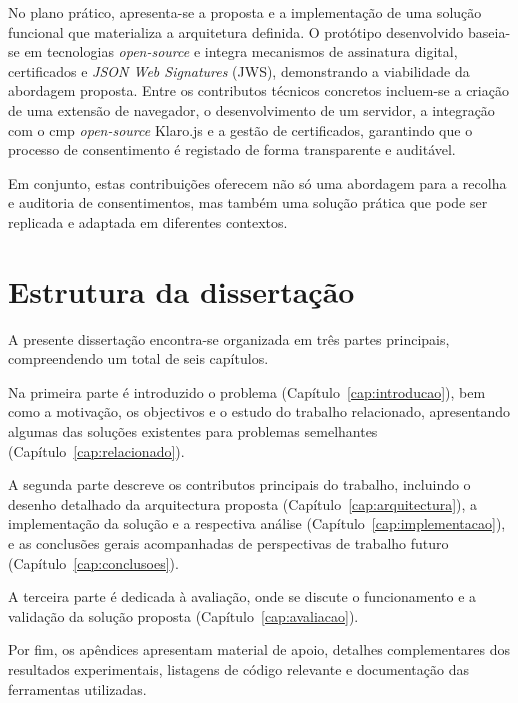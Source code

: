 No plano prático, apresenta-se a proposta e a implementação de uma solução funcional que materializa a arquitetura definida. O protótipo desenvolvido baseia-se em tecnologias \textit{open-source} e integra mecanismos de assinatura digital, certificados e \textit{JSON Web Signatures} (JWS), demonstrando a viabilidade da abordagem proposta. Entre os contributos técnicos concretos incluem-se a criação de uma extensão de navegador, o desenvolvimento de um servidor, a integração com o \acrshort{cmp} \textit{open-source} Klaro.js e a gestão de certificados, garantindo que o processo de consentimento é registado de forma transparente e auditável.

Em conjunto, estas contribuições oferecem não só uma abordagem para a recolha e auditoria de consentimentos, mas também uma solução prática que pode ser replicada e adaptada em diferentes contextos.

\section{Estrutura da dissertação}

A presente dissertação encontra-se organizada em três partes principais, compreendendo um total de seis capítulos.

Na primeira parte é introduzido o problema (Capítulo~\ref{cap:introducao}), bem como a motivação, os objectivos e o estudo do trabalho relacionado, apresentando algumas das soluções existentes para problemas semelhantes (Capítulo~\ref{cap:relacionado}).

A segunda parte descreve os contributos principais do trabalho, incluindo o desenho detalhado da arquitectura proposta (Capítulo~\ref{cap:arquitectura}), a implementação da solução e a respectiva análise (Capítulo~\ref{cap:implementacao}), e as conclusões gerais acompanhadas de perspectivas de trabalho futuro (Capítulo~\ref{cap:conclusoes}).

A terceira parte é dedicada à avaliação, onde se discute o funcionamento e a validação da solução proposta (Capítulo~\ref{cap:avaliacao}).

Por fim, os apêndices apresentam material de apoio, detalhes complementares dos resultados experimentais, listagens de código relevante e documentação das ferramentas utilizadas.
